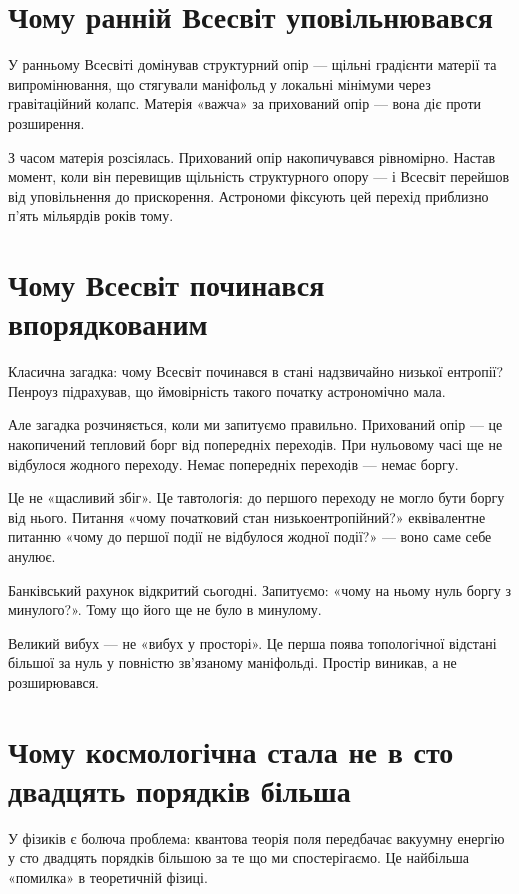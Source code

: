 \documentclass[12pt, a4paper, openany]{book}
\begin{document}
\section{Чому ранній Всесвіт уповільнювався}

У ранньому Всесвіті домінував структурний опір --- щільні градієнти матерії та випромінювання, що стягували маніфольд у локальні мінімуми через гравітаційний колапс. Матерія «важча» за прихований опір --- вона діє проти розширення.

З часом матерія розсіялась. Прихований опір накопичувався рівномірно. Настав момент, коли він перевищив щільність структурного опору --- і Всесвіт перейшов від уповільнення до прискорення. Астрономи фіксують цей перехід приблизно п'ять мільярдів років тому.

\section{Чому Всесвіт починався впорядкованим}

Класична загадка: чому Всесвіт починався в стані надзвичайно низької ентропії? Пенроуз підрахував, що ймовірність такого початку астрономічно мала.

Але загадка розчиняється, коли ми запитуємо правильно. Прихований опір --- це накопичений тепловий борг від попередніх переходів. При нульовому часі ще не відбулося жодного переходу. Немає попередніх переходів --- немає боргу.

Це не «щасливий збіг». Це тавтологія: до першого переходу не могло бути боргу від нього. Питання «чому початковий стан низькоентропійний?» еквівалентне питанню «чому до першої події не відбулося жодної події?» --- воно саме себе анулює.

\begin{analogybox}
Банківський рахунок відкритий сьогодні. Запитуємо: «чому на ньому нуль боргу з минулого?». Тому що його ще не було в минулому.
\end{analogybox}

Великий вибух --- не «вибух у просторі». Це перша поява топологічної відстані більшої за нуль у повністю зв'язаному маніфольді. Простір виникав, а не розширювався.

\section{Чому космологічна стала не в сто двадцять порядків більша}

У фізиків є болюча проблема: квантова теорія поля передбачає вакуумну енергію у сто двадцять порядків більшою за те що ми спостерігаємо. Це найбільша «помилка» в теоретичній фізиці.
\end{document}
